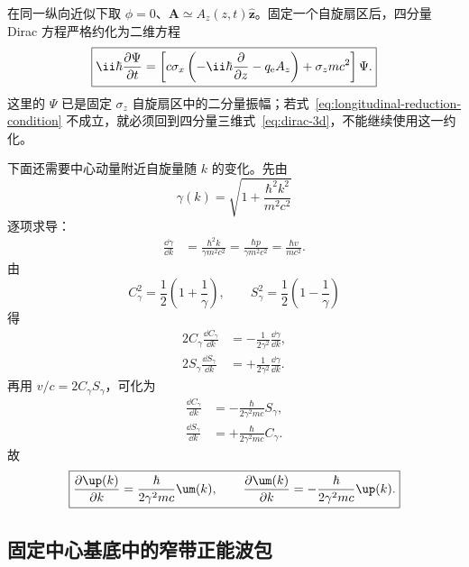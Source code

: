 在同一纵向近似下取 $\phi=0$、$\bm A\simeq A_z(z,t)\hat{\bm z}$。固定一个自旋扇区后，四分量 Dirac 方程严格约化为二维方程
\begin{equation}
 \boxed{
 \ii\hbar\frac{\partial\Psi}{\partial t}
 =\left[c\sigma_x\left(-\ii\hbar\frac{\partial}{\partial z}-q_{\rm e}A_z\right)
 +\sigma_zmc^2\right]\Psi.}
 \label{eq:dirac}
\end{equation}
这里的 $\Psi$ 已是固定 $\sigma_z$ 自旋扇区中的二分量振幅；若式~\eqref{eq:longitudinal-reduction-condition} 不成立，就必须回到四分量三维式~\eqref{eq:dirac-3d}，不能继续使用这一约化。

下面还需要中心动量附近自旋量随 $k$ 的变化。先由
\[
 \gamma(k)=\sqrt{1+\frac{\hbar^2k^2}{m^2c^2}}
\]
逐项求导：
\begin{align}
 \frac{\dd\gamma}{\dd k}
 &=\frac{\hbar^2k}{\gamma m^2c^2}
 =\frac{\hbar p}{\gamma m^2c^2}
 =\frac{\hbar v}{mc^2}.
 \label{eq:dgammak}
\end{align}
由
\[
 C_\gamma^2=\frac12\left(1+\frac1\gamma\right),
 \qquad
 S_\gamma^2=\frac12\left(1-\frac1\gamma\right)
\]
得
\begin{align}
 2C_\gamma\frac{\dd C_\gamma}{\dd k}
 &=-\frac{1}{2\gamma^2}\frac{\dd\gamma}{\dd k},\\
 2S_\gamma\frac{\dd S_\gamma}{\dd k}
 &=+\frac{1}{2\gamma^2}\frac{\dd\gamma}{\dd k}.
\end{align}
再用 $v/c=2C_\gamma S_\gamma$，可化为
\begin{align}
 \frac{\dd C_\gamma}{\dd k}
 &=-\frac{\hbar}{2\gamma^2mc}S_\gamma,\\
 \frac{\dd S_\gamma}{\dd k}
 &=+\frac{\hbar}{2\gamma^2mc}C_\gamma.
\end{align}
故
\begin{equation}
 \boxed{
 \frac{\partial\up(k)}{\partial k}
 =\frac{\hbar}{2\gamma^2mc}\um(k),
 \qquad
 \frac{\partial\um(k)}{\partial k}
 =-\frac{\hbar}{2\gamma^2mc}\up(k).}
 \label{eq:spinor-derivatives}
\end{equation}

\subsection{固定中心基底中的窄带正能波包}

